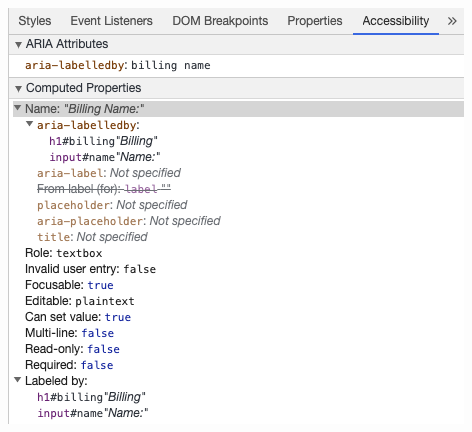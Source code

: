 \begin{center} 
\includegraphics{./img/AccessibleARIAlabelledbyDevTools.56ced2ed.png} 
\end{center}
    

